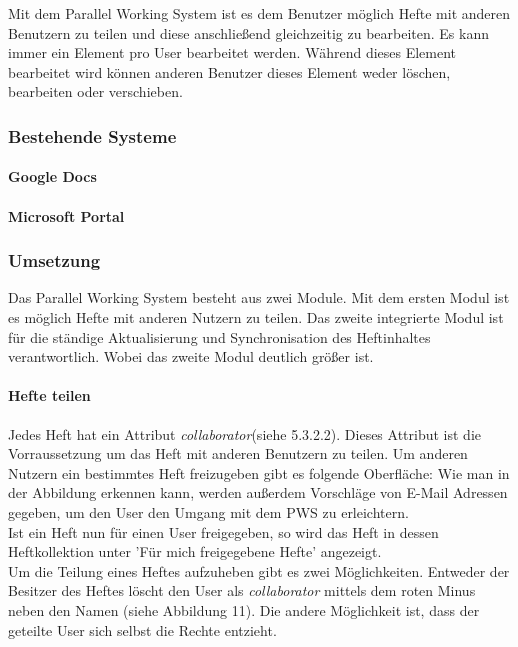 Mit dem Parallel Working System ist es dem Benutzer möglich Hefte mit anderen Benutzern zu teilen und diese anschließend gleichzeitig zu bearbeiten. Es kann immer ein Element pro User bearbeitet werden. Während dieses Element bearbeitet wird können anderen Benutzer dieses Element weder löschen, bearbeiten oder verschieben. 
\subsubsection{Bestehende Systeme}
\paragraph{Google Docs}
\paragraph{Microsoft Portal}
\subsubsection{Umsetzung}
Das Parallel Working System besteht aus zwei Module. Mit dem ersten Modul ist es möglich Hefte mit anderen Nutzern zu teilen. Das zweite integrierte Modul ist für die ständige Aktualisierung und Synchronisation des Heftinhaltes verantwortlich. Wobei das zweite Modul deutlich größer ist.
\paragraph{Hefte teilen}
Jedes Heft hat ein Attribut \textit{collaborator}(siehe 5.3.2.2). Dieses Attribut ist die Vorraussetzung um das Heft mit anderen Benutzern zu teilen. 
Um anderen Nutzern ein bestimmtes Heft freizugeben gibt es folgende Oberfläche:
Wie man in der Abbildung erkennen kann, werden außerdem Vorschläge von E-Mail Adressen gegeben, um den User den Umgang mit dem PWS zu erleichtern.\\

Ist ein Heft nun für einen User freigegeben, so wird das Heft in dessen Heftkollektion unter 'Für mich freigegebene Hefte' angezeigt. \\
Um die Teilung eines Heftes aufzuheben gibt es zwei Möglichkeiten. Entweder der Besitzer des Heftes löscht den User als \textit{collaborator} mittels dem roten Minus neben den Namen (siehe Abbildung 11). Die andere Möglichkeit ist, dass der geteilte User sich selbst die Rechte entzieht.

